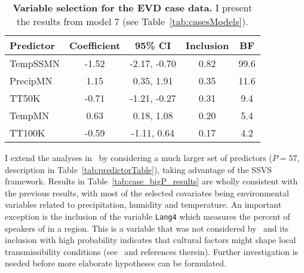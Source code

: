 \begin{minipage}{\textwidth}    
\setcounter{mpfootnote}{\value{footnote}}
\renewcommand{\thempfootnote}{\arabic{mpfootnote}}
\fontsize{9}{11}\selectfont
{}
\begin{longtable}{lcccc}
\caption{\textbf{Variable selection for the EVD case data.}
I present the results from model 7 (see Table~\ref{tab:casesModels}).
}
\label{tab:case_glm_results}\\
\toprule
Predictor\footnotemark[1] & Coefficient\footnotemark[2] & 95\% CI\footnotemark[3] & Inclusion\footnotemark[4] & BF\footnotemark[5] \\
\toprule
TempSSMN & -1.52 & -2.17, -0.70 & 0.82 & 99.6 \\
\hline
PrecipMN & 1.15 & 0.35, 1.91 & 0.35 & 11.6 \\
\hline
TT50K &  -0.71 & -1.21, -0.27 & 0.31 & 9.4 \\
\hline
TempMN &  0.63 & 0.18, 1.08 & 0.20 & 5.4 \\
\hline
TT100K & -0.59 & -1.11, 0.64 & 0.17 & 4.2\\
\bottomrule
\end{longtable}
\setcounter{footnote}{\value{mpfootnote}}
\end{minipage}

I extend the analyses in~\cite{Dudas2017} by considering a much larger set of predictors ($P = 57$, description in Table~\ref{tab:predictorTable}), taking advantage of the SSVS framework.
Results in Table~\ref{tab:case_bigP_results} are wholly consistent with the previous results, with most of the selected covariates being environmental variables related to precipitation, humidity and temperature.
An important exception is the inclusion of the variable \verb|Lang4| which measures the percent of speakers of { \color{red}{SOME LANGUAGE} } in a region.
This is a variable that was not considered by~\cite{Dudas2017} and its inclusion with high probability indicates that cultural factors might shape local transmissibility conditions (see~\cite{Alexander2015} and references therein).
Further investigation is needed before more elaborate hypotheses can be formulated.

